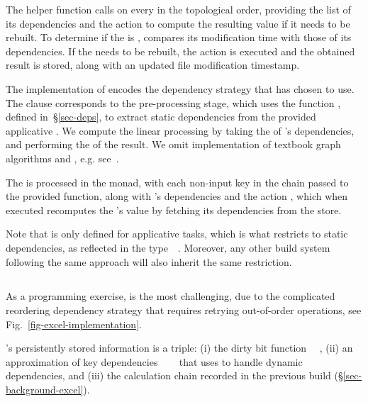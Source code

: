 The helper function  calls  on every  in
the topological order, providing the list of its dependencies  and the
action  to compute the resulting value if it needs to be rebuilt. To
determine if the  is ,  compares its modification
time with those of its dependencies. If the  needs to be rebuilt, the
action  is executed and the obtained result is stored, along with an
updated file modification timestamp.

The implementation of  encodes the dependency strategy that
\Make has chosen to use. The  clause corresponds to the pre-processing
stage, which uses the function , defined in~\S\ref{sec-deps},
to extract static dependencies from the provided applicative . We
compute the linear processing  by taking the 
of 's dependencies, and performing the  of the
result. We omit implementation of textbook graph algorithms
 and , e.g.
see~\cite{cormen2001introduction}.

The  is processed in the  monad, with each non-input key
 in the chain passed to the provided  function, along with
's dependencies and the action , which when executed recomputes
the 's value by fetching its dependencies from the store.

Note that  is only defined for applicative tasks, which is what
restricts \Make to static dependencies, as reflected in the
type~~. Moreover, any other build system following
the same  approach will also inherit the same restriction.

\subsection{\Excel}\label{sec-implementation-excel}

As a programming exercise, \Excel is the most challenging, due to the
complicated reordering dependency strategy that requires retrying out-of-order
operations, see Fig.~\ref{fig-excel-implementation}.

\Excel's persistently stored information is a triple: (i) the dirty bit
function ~\hs{->}~, (ii) an approximation of key dependencies
~\hs{->}~~ that \Excel uses to handle
dynamic dependencies, and (iii) the calculation chain \hs{[@@k]} recorded in the
previous build (\S\ref{sec-background-excel}).

